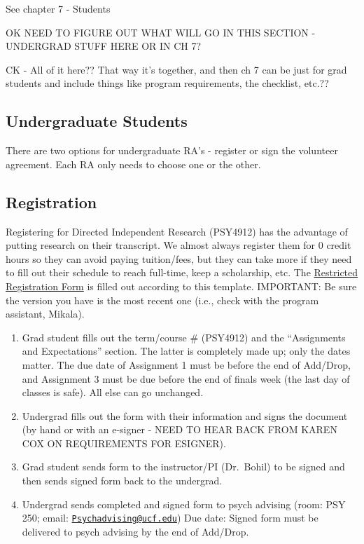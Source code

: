 \documentclass[
]{book}
\providecommand{\tightlist}{%
  \setlength{\itemsep}{0pt}\setlength{\parskip}{0pt}}
\begin{document}
See chapter 7 - Students

OK NEED TO FIGURE OUT WHAT WILL GO IN THIS SECTION - UNDERGRAD STUFF HERE OR IN CH 7?

CK - All of it here?? That way it's together, and then ch 7 can be just for grad students and include things like program requirements, the checklist, etc.??

\hypertarget{undergraduate-students}{%
\subsection{Undergraduate Students}\label{undergraduate-students}}

There are two options for undergraduate RA's - register or sign the volunteer agreement. Each RA only needs to choose one or the other.

\hypertarget{registration}{%
\subsection{Registration}\label{registration}}

Registering for Directed Independent Research (PSY4912) has the advantage of putting research on their transcript. We almost always register them for 0 credit hours so they can avoid paying tuition/fees, but they can take more if they need to fill out their schedule to reach full-time, keep a scholarship, etc. The \href{docs/resources/Undergraduate\%20Registration\%20Agreement\%20Summer\%202020.pdf}{Restricted Registration Form} is filled out according to this template. IMPORTANT: Be sure the version you have is the most recent one (i.e., check with the program assistant, Mikala).

\begin{enumerate}
\def\labelenumi{\arabic{enumi}.}
\tightlist
\item
  Grad student fills out the term/course \# (PSY4912) and the ``Assignments and Expectations'' section. The latter is completely made up; only the dates matter. The due date of Assignment 1 must be before the end of Add/Drop, and Assignment 3 must be due before the end of finals week (the last day of classes is safe). All else can go unchanged.
\item
  Undergrad fills out the form with their information and signs the document (by hand or with an e-signer - NEED TO HEAR BACK FROM KAREN COX ON REQUIREMENTS FOR ESIGNER).
\item
  Grad student sends form to the instructor/PI (Dr.~Bohil) to be signed and then sends signed form back to the undergrad.
\item
  Undergrad sends completed and signed form to psych advising (room: PSY 250; email: \href{mailto:Psychadvising@ucf.edu}{\nolinkurl{Psychadvising@ucf.edu}})
  Due date: Signed form must be delivered to psych advising by the end of Add/Drop.
\end{enumerate}
\end{document}
